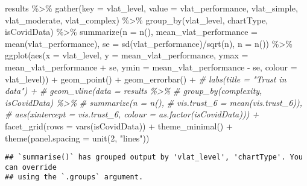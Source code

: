 \documentclass[
]{article}
\newenvironment{Shaded}{\begin{snugshade}}{\end{snugshade}}
\newcommand{\AttributeTok}[1]{\textcolor[rgb]{0.77,0.63,0.00}{#1}}
\newcommand{\CommentTok}[1]{\textcolor[rgb]{0.56,0.35,0.01}{\textit{#1}}}
\newcommand{\DecValTok}[1]{\textcolor[rgb]{0.00,0.00,0.81}{#1}}
\newcommand{\FunctionTok}[1]{\textcolor[rgb]{0.00,0.00,0.00}{#1}}
\newcommand{\NormalTok}[1]{#1}
\newcommand{\SpecialCharTok}[1]{\textcolor[rgb]{0.00,0.00,0.00}{#1}}
\newcommand{\StringTok}[1]{\textcolor[rgb]{0.31,0.60,0.02}{#1}}
\begin{document}
\begin{Shaded}
\begin{Highlighting}[]
\NormalTok{results }\SpecialCharTok{\%\textgreater{}\%}
  \FunctionTok{gather}\NormalTok{(}\AttributeTok{key =}\NormalTok{ vlat\_level, }\AttributeTok{value =}\NormalTok{ vlat\_performance, vlat\_simple,  vlat\_moderate, vlat\_complex) }\SpecialCharTok{\%\textgreater{}\%}
  \FunctionTok{group\_by}\NormalTok{(vlat\_level, chartType, isCovidData) }\SpecialCharTok{\%\textgreater{}\%}
  \FunctionTok{summarize}\NormalTok{(}\AttributeTok{n =} \FunctionTok{n}\NormalTok{(),}
            \AttributeTok{mean\_vlat\_performance =} \FunctionTok{mean}\NormalTok{(vlat\_performance),}
            \AttributeTok{se =} \FunctionTok{sd}\NormalTok{(vlat\_performance)}\SpecialCharTok{/}\FunctionTok{sqrt}\NormalTok{(n),}
            \AttributeTok{n =} \FunctionTok{n}\NormalTok{()) }\SpecialCharTok{\%\textgreater{}\%}
  \FunctionTok{ggplot}\NormalTok{(}\FunctionTok{aes}\NormalTok{(}\AttributeTok{x =}\NormalTok{ vlat\_level, }\AttributeTok{y =}\NormalTok{ mean\_vlat\_performance, }
             \AttributeTok{ymax =}\NormalTok{ mean\_vlat\_performance }\SpecialCharTok{+}\NormalTok{ se, }\AttributeTok{ymin =}\NormalTok{ mean\_vlat\_performance }\SpecialCharTok{{-}}\NormalTok{ se,}
             \AttributeTok{colour =}\NormalTok{ vlat\_level)) }\SpecialCharTok{+}
  \FunctionTok{geom\_point}\NormalTok{() }\SpecialCharTok{+}
  \FunctionTok{geom\_errorbar}\NormalTok{() }\SpecialCharTok{+}
  \CommentTok{\# labs(title = "Trust in data") + }
  \CommentTok{\# geom\_vline(data = results \%\textgreater{}\% }
  \CommentTok{\#              group\_by(complexity, isCovidData) \%\textgreater{}\%}
  \CommentTok{\#              summarize(n = n(), }
  \CommentTok{\#                        vis.trust\_6 = mean(vis.trust\_6)), }
  \CommentTok{\#            aes(xintercept = vis.trust\_6, colour = as.factor(isCovidData))) +}
  \FunctionTok{facet\_grid}\NormalTok{(}\AttributeTok{rows =} \FunctionTok{vars}\NormalTok{(isCovidData)) }\SpecialCharTok{+}
  \FunctionTok{theme\_minimal}\NormalTok{() }\SpecialCharTok{+} 
  \FunctionTok{theme}\NormalTok{(}\AttributeTok{panel.spacing =} \FunctionTok{unit}\NormalTok{(}\DecValTok{2}\NormalTok{, }\StringTok{"lines"}\NormalTok{))}
\end{Highlighting}
\end{Shaded}

\begin{verbatim}
## `summarise()` has grouped output by 'vlat_level', 'chartType'. You can override
## using the `.groups` argument.
\end{verbatim}
\end{document}
